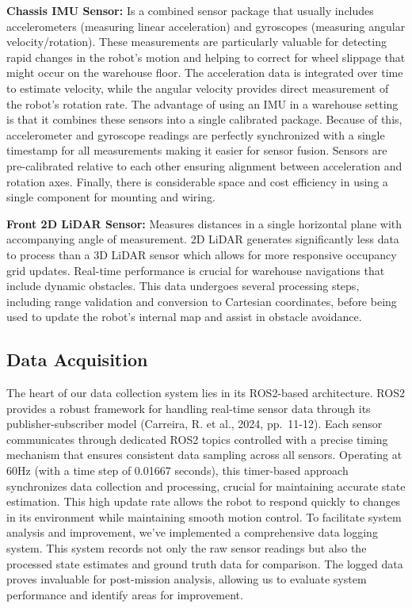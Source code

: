\documentclass[
  letterpaper,
  DIV=11,
  numbers=noendperiod]{scrartcl}
\begin{document}
\textbf{Chassis IMU Sensor:} Is a combined sensor package that usually
includes accelerometers (measuring linear acceleration) and gyroscopes
(measuring angular velocity/rotation). These measurements are
particularly valuable for detecting rapid changes in the robot's motion
and helping to correct for wheel slippage that might occur on the
warehouse floor. The acceleration data is integrated over time to
estimate velocity, while the angular velocity provides direct
measurement of the robot's rotation rate. The advantage of using an IMU
in a warehouse setting is that it combines these sensors into a single
calibrated package. Because of this, accelerometer and gyroscope
readings are perfectly synchronized with a single timestamp for all
measurements making it easier for sensor fusion. Sensors are
pre-calibrated relative to each other ensuring alignment between
acceleration and rotation axes. Finally, there is considerable space and
cost efficiency in using a single component for mounting and wiring.

\textbf{Front 2D LiDAR Sensor:} Measures distances in a single
horizontal plane with accompanying angle of measurement. 2D LiDAR
generates significantly less data to process than a 3D LiDAR sensor
which allows for more responsive occupancy grid updates. Real-time
performance is crucial for warehouse navigations that include dynamic
obstacles. This data undergoes several processing steps, including range
validation and conversion to Cartesian coordinates, before being used to
update the robot's internal map and assist in obstacle avoidance.

\hypertarget{data-acquisition}{%
\subsection{Data Acquisition}\label{data-acquisition}}

The heart of our data collection system lies in its ROS2-based
architecture. ROS2 provides a robust framework for handling real-time
sensor data through its publisher-subscriber model (Carreira, R. et al.,
2024, pp.~11-12). Each sensor communicates through dedicated ROS2 topics
controlled with a precise timing mechanism that ensures consistent data
sampling across all sensors. Operating at 60Hz (with a time step of
0.01667 seconds), this timer-based approach synchronizes data collection
and processing, crucial for maintaining accurate state estimation. This
high update rate allows the robot to respond quickly to changes in its
environment while maintaining smooth motion control. To facilitate
system analysis and improvement, we've implemented a comprehensive data
logging system. This system records not only the raw sensor readings but
also the processed state estimates and ground truth data for comparison.
The logged data proves invaluable for post-mission analysis, allowing us
to evaluate system performance and identify areas for improvement.
\end{document}
